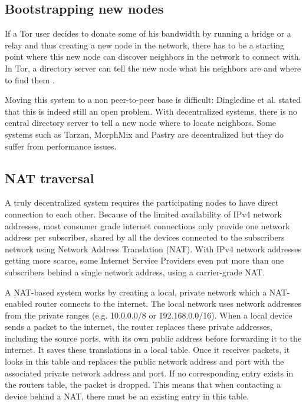 \documentclass{article}
\begin{document}
	\subsection{Bootstrapping new nodes}
		If a Tor user decides to donate some of his bandwidth by running a bridge or a relay and thus creating a new node in the network, there has to be a starting point where this new node can discover neighbors in the network to connect with. In Tor, a directory server can tell the new node what his neighbors are and where to find them \cite{dingledine2004tor}.
		
		Moving this system to a non peer-to-peer base is difficult: Dingledine et al. stated that this is indeed still an open problem. With decentralized systems, there is no central directory server to tell a new node where to locate neighbors. Some systems such as Tarzan, MorphMix and Pastry \cite{rowstron2001pastry, rennhard2002introducing} are decentralized but they do suffer from performance issues.

	\subsection{NAT traversal}
		A truly decentralized system requires the participating nodes to have direct connection to each other. Because of the limited availability of IPv4 network addresses, most consumer grade internet connections only provide one network address per subscriber, shared by all the devices connected to the subscribers network using Network Address Translation (NAT). With IPv4 network addresses getting more scarce, some Internet Service Providers even put more than one subscribers behind a single network address, using a carrier-grade NAT.
		
		A NAT-based system works by creating a local, private network which a NAT-enabled router connects to the internet. The local network uses network addresses from the private ranges (e.g. 10.0.0.0/8 or 192.168.0.0/16). When a local device sends a packet to the internet, the router replaces these private addresses, including the source ports, with its own public address before forwarding it to the internet. It saves these translations in a local table. Once it receives packets, it looks in this table and replaces the public network address and port with the associated private network address and port. If no corresponding entry exists in the routers table, the packet is dropped. This means that when contacting a device behind a NAT, there must be an existing entry in this table.
		
\end{document}
